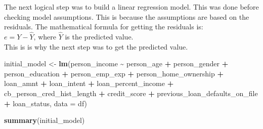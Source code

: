 \documentclass[
  10pt,
]{article}
\newenvironment{Shaded}{\begin{snugshade}}{\end{snugshade}}
\newcommand{\AttributeTok}[1]{\textcolor[rgb]{0.13,0.29,0.53}{#1}}
\newcommand{\FunctionTok}[1]{\textcolor[rgb]{0.13,0.29,0.53}{\textbf{#1}}}
\newcommand{\NormalTok}[1]{#1}
\newcommand{\OtherTok}[1]{\textcolor[rgb]{0.56,0.35,0.01}{#1}}
\newcommand{\SpecialCharTok}[1]{\textcolor[rgb]{0.81,0.36,0.00}{\textbf{#1}}}
\begin{document}
The next logical step was to build a linear regression model. This was
done before checking model assumptions. This is because the assumptions
are based on the residuals. The mathematical formula for getting the
residuals is:\\

\(e = Y - \hat{Y}\), where \(\hat{Y}\) is the predicted value.\\

This is is why the next step was to get the predicted value.\\

\begin{Shaded}
\begin{Highlighting}[]
\NormalTok{initial\_model }\OtherTok{\textless{}{-}} \FunctionTok{lm}\NormalTok{(person\_income }\SpecialCharTok{\textasciitilde{}}\NormalTok{ person\_age }\SpecialCharTok{+}\NormalTok{ person\_gender }\SpecialCharTok{+}
\NormalTok{    person\_education }\SpecialCharTok{+}\NormalTok{ person\_emp\_exp }\SpecialCharTok{+}\NormalTok{ person\_home\_ownership }\SpecialCharTok{+}
\NormalTok{    loan\_amnt }\SpecialCharTok{+}\NormalTok{ loan\_intent }\SpecialCharTok{+}\NormalTok{ loan\_percent\_income }\SpecialCharTok{+}\NormalTok{ cb\_person\_cred\_hist\_length }\SpecialCharTok{+}
\NormalTok{    credit\_score }\SpecialCharTok{+}\NormalTok{ previous\_loan\_defaults\_on\_file }\SpecialCharTok{+}\NormalTok{ loan\_status,}
    \AttributeTok{data =}\NormalTok{ df)}

\FunctionTok{summary}\NormalTok{(initial\_model)}
\end{Highlighting}
\end{Shaded}
\end{document}
